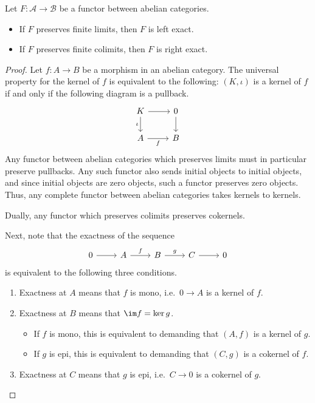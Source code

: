 \documentclass[main.tex]{subfiles}
\begin{document}
\begin{proposition}
  \label{prop:exact_if_preserve_limits_conditions}
  Let $F\colon \mathcal{A} \to \mathcal{B}$ be a functor between abelian categories.
  \begin{itemize}
    \item If $F$ preserves finite limits, then $F$ is left exact.

    \item If $F$ preserves finite colimits, then $F$ is right exact.
  \end{itemize}
\end{proposition}
\begin{proof}
  Let $f\colon A \to B$ be a morphism in an abelian category. The universal property for the kernel of $f$ is equivalent to the following: $(K, \iota)$ is a kernel of $f$ if and only if the following diagram is a pullback.
  \begin{equation*}
    \begin{tikzcd}
      K
      \arrow[r]
      \arrow[d, swap, "\iota"]
      & 0
      \arrow[d]
      \\
      A
      \arrow[r, swap, "f"]
      & B
    \end{tikzcd}
  \end{equation*}
  Any functor between abelian categories which preserves limits must in particular preserve pullbacks. Any such functor also sends initial objects to initial objects, and since initial objects are zero objects, such a functor preserves zero objects. Thus, any complete functor between abelian categories takes kernels to kernels.

  Dually, any functor which preserves colimits preserves cokernels.

  Next, note that the exactness of the sequence
  \begin{equation*}
    \begin{tikzcd}
      0
      \arrow[r]
      & A
      \arrow[r, "f"]
      & B
      \arrow[r, "g"]
      & C
      \arrow[r]
      & 0
    \end{tikzcd}
  \end{equation*}
  is equivalent to the following three conditions.
  \begin{enumerate}
    \item Exactness at $A$ means that $f$ is mono, i.e.\ $0 \to A$ is a kernel of $f$.

    \item Exactness at $B$ means that $\im f = \ker g$.
      \begin{itemize}
        \item If $f$ is mono, this is equivalent to demanding that $(A, f)$ is a kernel of $g$.

        \item If $g$ is epi, this is equivalent to demanding that $(C, g)$ is a cokernel of $f$.
      \end{itemize}

    \item Exactness at $C$ means that $g$ is epi, i.e.\ $C \to 0$ is a cokernel of $g$.
  \end{enumerate}
\end{proof}
\end{document}
